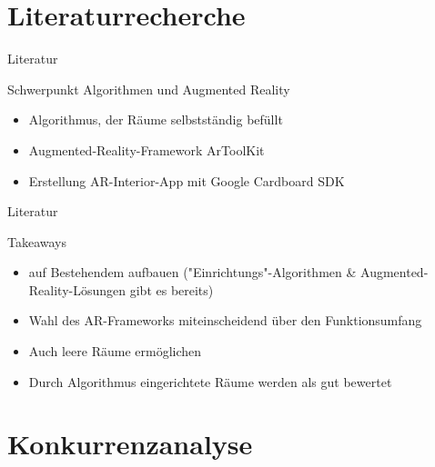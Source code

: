 \documentclass[presentation,bigger,aspectratio=169]{beamer}
\begin{document}
\section{Literaturrecherche}
\label{sec:orgcf1d66d}
\begin{frame}[label={sec:org4248cea}]{\vspace{2.2cm}\begin{center}\MakeUppercase{\insertsection}\end{center}}
\end{frame}

\begin{frame}[label={sec:org565a545}]{Literatur}
\begin{block}{Schwerpunkt Algorithmen und Augmented Reality}
\begin{itemize}
\item Algorithmus, der Räume selbstständig befüllt

\parencite{kanAutomatedInteriorDesign2017}
\item Augmented-Reality-Framework ArToolKit

\parencite{sanduAugmentedRealityUses2018}
\item Erstellung AR-Interior-App mit Google Cardboard SDK

\parencite{moaresInterARInterior2020}
\end{itemize}
\end{block}
\end{frame}

\begin{frame}[label={sec:org27ef1d2}]{Literatur}
\begin{block}{Takeaways}
\begin{itemize}
\item auf Bestehendem aufbauen ("Einrichtungs"-Algorithmen \&
Augmented-Reality-Lösungen gibt es bereits)
\item Wahl des AR-Frameworks miteinscheidend über den Funktionsumfang
\item Auch leere Räume ermöglichen
\item Durch Algorithmus eingerichtete Räume werden als gut bewertet
\end{itemize}
\end{block}
\end{frame}

\section{Konkurrenzanalyse}
\label{sec:orgcce30e9}
\begin{frame}[label={sec:org6bb5f8c}]{\vspace{2.2cm}\begin{center}\MakeUppercase{\insertsection}\end{center}}
\end{frame}
\end{document}
